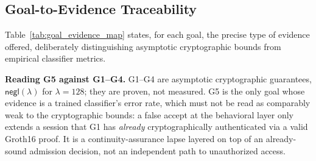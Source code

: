\documentclass[journal,twoside,10pt]{IEEEtran}
\begin{document}
\subsection{Goal-to-Evidence Traceability}
Table~\ref{tab:goal_evidence_map} states, for each goal, the precise type
of evidence offered, deliberately distinguishing asymptotic cryptographic
bounds from empirical classifier metrics.

\begin{table}[!t]
\renewcommand{\arraystretch}{1.3}
\caption{Security Goals Mapped to Evidence Type and Bound.}
\label{tab:goal_evidence_map}
\centering
{}
\end{table}

\textbf{Reading G5 against G1--G4.} G1--G4 are asymptotic cryptographic
guarantees, $\mathsf{negl}(\lambda)$ for $\lambda=128$; they are proven, not
measured. G5 is the only goal whose evidence is a trained classifier's
error rate, which must not be read as comparably weak to the cryptographic
bounds: a false accept at the behavioral layer only extends a session that
G1 has \emph{already} cryptographically authenticated via a valid Groth16
proof. It is a continuity-assurance lapse layered on top of an
already-sound admission decision, not an independent path to unauthorized
access.
\end{document}
